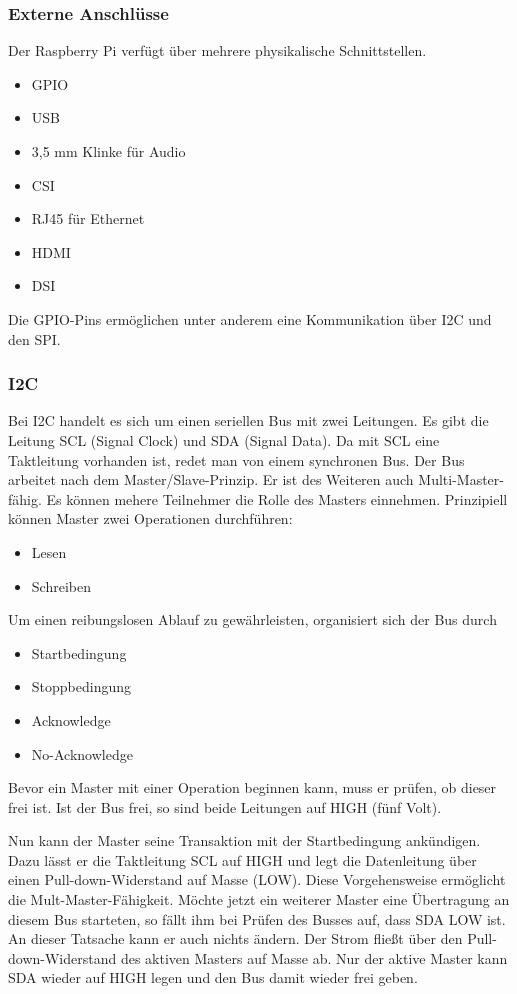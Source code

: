 
\subsubsection{Externe Anschlüsse}
Der Raspberry Pi verfügt über mehrere physikalische Schnittstellen. 
\begin{itemize}
\item \ac{GPIO}
\item USB
\item 3,5 mm Klinke für Audio
\item \ac{CSI}
\item RJ45 für Ethernet
\item HDMI
\item \ac{DSI}
\end{itemize}

Die \ac{GPIO}-Pins ermöglichen unter anderem eine Kommunikation über \ac{I2C} und den \ac{SPI}. 

\subsubsection{\ac{I2C}} Bei \ac{I2C} handelt es sich um einen seriellen Bus mit zwei Leitungen. Es gibt die Leitung SCL (Signal Clock) und SDA (Signal Data). Da mit SCL eine Taktleitung vorhanden ist, redet man von einem synchronen Bus. Der Bus arbeitet nach dem Master/Slave-Prinzip. Er ist des Weiteren auch Multi-Master-fähig. Es können mehere Teilnehmer die Rolle des Masters einnehmen. Prinzipiell können Master zwei Operationen durchführen: 
\begin{itemize}
\item Lesen
\item Schreiben
\end{itemize} 
Um einen reibungslosen Ablauf zu gewährleisten, organisiert sich der Bus durch
\begin{itemize}
\item Startbedingung
\item Stoppbedingung
\item Acknowledge
\item No-Acknowledge
\end{itemize}
Bevor ein Master mit einer Operation beginnen kann, muss er prüfen, ob dieser frei ist. Ist der Bus frei, so sind beide Leitungen auf HIGH (fünf Volt). 


Nun kann der Master seine Transaktion mit der Startbedingung ankündigen. Dazu lässt er die Taktleitung SCL auf HIGH und legt die Datenleitung über einen Pull-down-Widerstand auf Masse (LOW). Diese Vorgehensweise ermöglicht die Mult-Master-Fähigkeit. Möchte jetzt ein weiterer Master eine Übertragung an diesem Bus starteten, so fällt ihm bei Prüfen des Busses auf, dass SDA LOW ist. An dieser Tatsache kann er auch nichts ändern. Der Strom fließt über den Pull-down-Widerstand des aktiven Masters auf Masse ab. Nur der aktive Master kann SDA wieder auf HIGH legen und den Bus damit wieder frei geben.  

